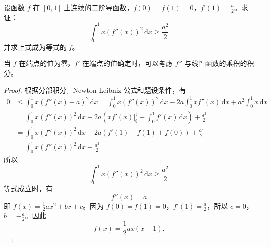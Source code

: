\documentclass[../../main.tex]{subfiles}%
\begin{document}
\begin{example}
设函数 \( f \) 在 \([0,1]\) 上连续的二阶导函数，\( f(0) = f(1) = 0 \)，\( f'(1) = \frac{a}{2} \)。求证：
\[
\int_{0}^{1} x(f''(x))^2 \, \mathrm{d}x \geqslant \frac{a^2}{2}
\]
并求上式成为等式的 \( f \)。
\end{example}
\begin{remark}
当 \( f \) 在端点的值为零，\( f' \) 在端点的值确定时，可以考虑 \( f'' \) 与线性函数的乘积的积分。
\end{remark}
\begin{proof}

根据分部积分，Newton-Leibniz 公式和题设条件，有
\begin{align*}
0 &\leqslant \int_{0}^{1} x(f''(x) - a)^2 \, \mathrm{d}x = \int_{0}^{1} x(f''(x))^2 \, \mathrm{d}x - 2a \int_{0}^{1} x f''(x) \, \mathrm{d}x + a^2 \int_{0}^{1} x \, \mathrm{d}x \\
&= \int_{0}^{1} x(f''(x))^2 \, \mathrm{d}x - 2a \left( x f'(x)\big|_{0}^{1} - \int_{0}^{1} f'(x) \, \mathrm{d}x \right) + \frac{a^2}{2} \\
&= \int_{0}^{1} x(f''(x))^2 \, \mathrm{d}x - 2a \left( f'(1) - f(1) + f(0) \right) + \frac{a^2}{2} \\
&= \int_{0}^{1} x(f''(x))^2 \, \mathrm{d}x - \frac{a^2}{2}
\end{align*}
所以
\[
\int_{0}^{1} x(f''(x))^2 \, \mathrm{d}x \geqslant \frac{a^2}{2}
\]
等式成立时，有
\[
f''(x) = a
\]
即 \( f(x) = \frac{1}{2} a x^2 + b x + c \)。因为 \( f(0) = f(1) = 0 \)，\( f'(1) = \frac{a}{2} \)，所以 \( c = 0 \)，\( b = -\frac{a}{2} \)。因此
\[
f(x) = \frac{1}{2} a x(x - 1).
\]

\end{proof}
\end{document}
